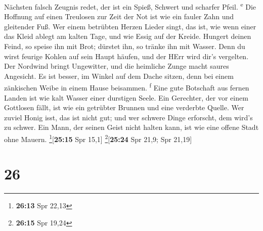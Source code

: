 Nächsten falsch Zeugnis redet, der ist ein Spieß, Schwert und scharfer
Pfeil. \textsuperscript{e}  Die Hoffnung auf einen
Treulosen zur Zeit der Not ist wie ein fauler Zahn und gleitender Fuß.
 Wer einem betrübten Herzen Lieder singt, das ist, wie
wenn einer das Kleid ablegt am kalten Tage, und wie Essig auf der
Kreide.  Hungert deinen Feind, so speise ihn mit Brot;
dürstet ihn, so tränke ihn mit Wasser.  Denn du wirst
feurige Kohlen auf sein Haupt häufen, und der HErr wird dir's vergelten.
 Der Nordwind bringt Ungewitter, und die heimliche Zunge
macht saures Angesicht.  Es ist besser, im Winkel auf dem
Dache sitzen, denn bei einem zänkischen Weibe in einem Hause beisammen.
\textsuperscript{f}  Eine gute Botschaft aus fernen
Landen ist wie kalt Wasser einer durstigen Seele.  Ein
Gerechter, der vor einem Gottlosen fällt, ist wie ein getrübter Brunnen
und eine verderbte Quelle.  Wer zuviel Honig isst, das
ist nicht gut; und wer schwere Dinge erforscht, dem wird's zu schwer.
 Ein Mann, der seinen Geist nicht halten kann, ist wie
eine offene Stadt ohne Mauern. \footnote{\textbf{26:13} Spr 22,13}{[}\textbf{25:15}
Spr 15,1{]} \footnote{\textbf{26:15} Spr 19,24}{[}\textbf{25:24} Spr
21,9; Spr 21,19{]}

\hypertarget{section-25}{%
\section{26}\label{section-25}}

